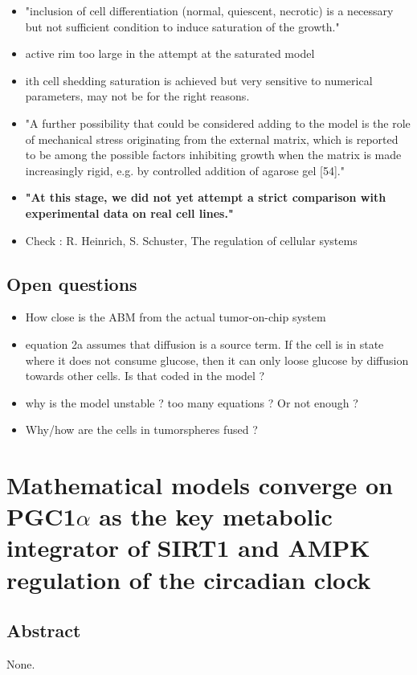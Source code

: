 \documentclass[11pt,a4paper]{article}
\begin{document}
\begin{itemize}
\item "inclusion of cell differentiation (normal, quiescent, necrotic) is a necessary but not sufficient condition to induce saturation of the growth."
\item active rim too large in the attempt at the  saturated model
\item ith cell shedding saturation is achieved but very sensitive to numerical parameters, may not be for the right reasons.
\item "A further possibility that could be considered adding to the model is the role of mechanical stress originating from the external matrix, which is reported to be among the possible factors inhibiting growth when the matrix is made increasingly rigid, e.g. by controlled addition of agarose gel [54]."
\item \textbf{"At this stage, we did not yet attempt a strict comparison with experimental data on real cell lines."}
\item Check : R. Heinrich, S. Schuster, The regulation of cellular systems
\end{itemize}

\subsection*{Open questions}
\begin{itemize}
\item How close is the ABM from the actual tumor-on-chip system
\item equation 2a assumes that diffusion is a source term. If the cell is in state where it does not consume glucose, then it can only loose glucose by diffusion towards other cells. Is that coded in the model ?
\item why is the model unstable ? too many equations ? Or not enough ?
\item Why/how are the cells in tumorspheres fused ?
\end{itemize}

\section*{Mathematical models converge on PGC1$\alpha$ as the key metabolic integrator of SIRT1 and AMPK regulation of the circadian clock}
\subsection*{Abstract}
None.
\end{document}
